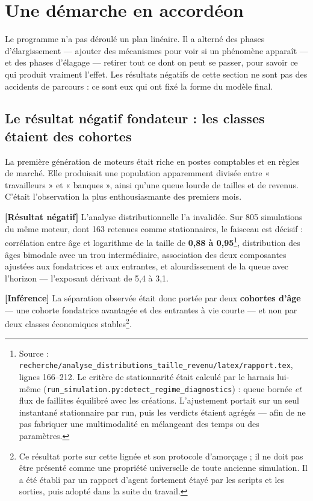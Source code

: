 \documentclass[11pt,a4paper]{article}
\newcommand{\code}[1]{\texttt{#1}}
\newcommand{\inference}{\textbf{[Inférence]}}
\newcommand{\negatif}{\textbf{[Résultat négatif]}}
\begin{document}
\section{Une démarche en accordéon}
\label{sec:trajectoire}

Le programme n'a pas déroulé un plan linéaire. Il a alterné des phases
d'élargissement --- ajouter des mécanismes pour voir si un phénomène apparaît
--- et des phases d'élagage --- retirer tout ce dont on peut se passer, pour
savoir ce qui produit vraiment l'effet. Les résultats négatifs de cette
section ne sont pas des accidents de parcours : ce sont eux qui ont fixé la
forme du modèle final.

\subsection{Le résultat négatif fondateur : les classes étaient des cohortes}

La première génération de moteurs était riche en postes comptables et en règles
de marché. Elle produisait une population apparemment divisée entre
« travailleurs » et « banques », ainsi qu'une queue lourde de tailles et de
revenus. C'était l'observation la plus enthousiasmante des premiers mois.

\negatif{} L'analyse distributionnelle l'a invalidée. Sur 805 simulations du
même moteur, dont 163 retenues comme stationnaires, le faisceau est décisif :
corrélation entre âge et logarithme de la taille de
\textbf{0,88 à 0,95}\footnote{Source :
\code{recherche/analyse\_distributions\_taille\_revenu/latex/rapport.tex},
lignes 166--212. Le critère de stationnarité était calculé par le harnais
lui-même (\code{run\_simulation.py:detect\_regime\_diagnostics}) : queue bornée
\emph{et} flux de faillites équilibré avec les créations. L'ajustement portait
sur un seul instantané stationnaire par run, puis les verdicts étaient agrégés
--- afin de ne pas fabriquer une multimodalité en mélangeant des temps ou des
paramètres.},
distribution des âges bimodale avec un trou intermédiaire, association des deux
composantes ajustées aux fondatrices et aux entrantes, et alourdissement de la
queue avec l'horizon --- l'exposant dérivant de 5,4 à 3,1.

\inference{} La séparation observée était donc portée par deux
\textbf{cohortes d'âge} --- une cohorte fondatrice avantagée et des entrantes à
vie courte --- et non par deux classes économiques stables\footnote{Ce résultat
porte sur cette lignée et son protocole d'amorçage ; il ne doit pas être
présenté comme une propriété universelle de toute ancienne simulation. Il a été
établi par un rapport d'agent fortement étayé par les scripts et les sorties,
puis adopté dans la suite du travail.}.
\end{document}
